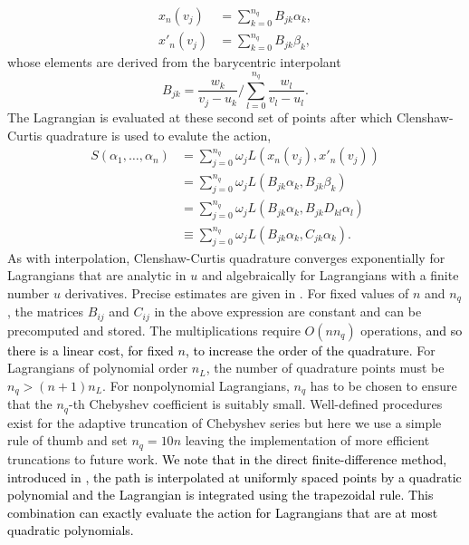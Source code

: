 \begin{align}
x_{n}(v_{j}) & =\sum_{k=0}^{n_{q}}B_{jk}\alpha_{k},\\
x'_{n}(v_{j}) & =\sum_{k=0}^{n_{q}}B_{jk}\beta_{k},
\end{align}
whose elements are derived from the barycentric interpolant
\begin{equation}
B_{jk}=\frac{w_{k}}{v_{j}-u_{k}}\bigg/\sum_{l=0}^{n_{q}}\frac{w_{l}}{v_{l}-u_{l}}.
\end{equation}
The Lagrangian is evaluated at these second set of points after which
Clenshaw-Curtis quadrature \citep{trefethen2000spectral,boyd2001chebyshev}
is used to evalute the action,
\begin{align}
S(\alpha_{1},\ldots,\alpha_{n}) & =\sum_{j=0}^{n_{q}}\omega_{j}L(x_{n}(v_{j}),x'_{n}(v_{j}))\label{eq:quadrature-formula}\\
 & =\sum_{j=0}^{n_{q}}\omega_{j}L(B_{jk}\alpha_{k},B_{jk}\beta_{k})\nonumber \\
 & =\sum_{j=0}^{n_{q}}\omega_{j}L(B_{jk}\alpha_{k},B_{jk}D_{kl}\alpha_{l})\nonumber \\
 & \equiv\sum_{j=0}^{n_{q}}\omega_{j}L(B_{jk}\alpha_{k},C_{jk}\alpha_{k}).\nonumber 
\end{align}
As with interpolation, Clenshaw-Curtis quadrature converges exponentially
for Lagrangians that are analytic in $u$ and algebraically for Lagrangians
with a finite number $u$ derivatives. Precise estimates are given
in \citep{trefethen2013approximation}. For fixed values of $n$ and
$n_{q}$, the matrices $B_{ij}$ and $C_{ij}$ in the above expression
are constant and can be precomputed and stored. The multiplications
require $O(nn_{q})$ operations, \textcolor{black}{and so there is
a linear cost, for fixed $n$, to increase the order of the quadrature.}
For Lagrangians of polynomial order $n_{L}$, the number of quadrature
points must be $n_{q}>(n+1)n_{L}.$ For nonpolynomial Lagrangians,
$n_{q}$ has to be chosen to ensure that the $n_{q}$-th Chebyshev
coefficient is suitably small. Well-defined procedures exist for the
adaptive truncation of Chebyshev series \citep{aurentz2017chopping}
but here we use a simple rule of thumb and set $n_{q}=10n$ leaving
the implementation of more efficient truncations to future work. \textcolor{black}{We
note that in the direct finite-difference method, introduced in \citep{weinan2004minimum},
the path is interpolated at uniformly spaced points by a quadratic
polynomial and the Lagrangian is integrated using the trapezoidal
rule. This combination can exactly evaluate the action for Lagrangians
that are at most quadratic polynomials.} %
